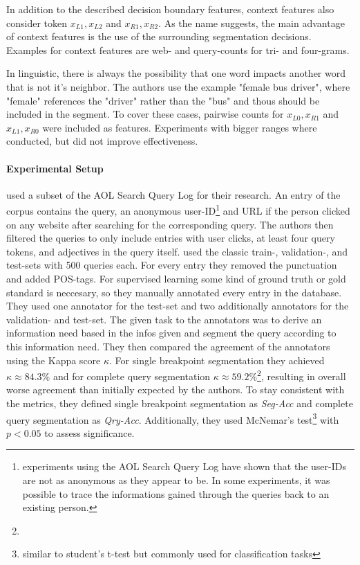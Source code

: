 In addition to the described decision boundary features, context features also consider token $x_{L1}, x_{L2}$ and $x_{R1}, x_{R2}$. As the name suggests, the main advantage of context features is the use of the surrounding segmentation decisions. Examples for context features are web- and query-counts for tri- and four-grams.

In linguistic, there is always the possibility that one word impacts another word that is not it's neighbor. The authors use the example "female bus driver", where "female" references the "driver" rather than the "bus" and thous should be included in the segment. To cover these cases, pairwise counts for $x_{L0},x_{R1}$ and $x_{L1},x_{R0}$ were included as features. Experiments with bigger ranges where conducted, but did not improve effectiveness.

\paragraph*{Experimental Setup}
\citeauthor{Bergsma:2007} used a subset of the AOL Search Query Log \cite{Pass:2006} for their research. An entry of the corpus contains the query, an anonymous user-ID\footnote{experiments using the AOL Search Query Log have shown that the user-IDs are not as anonymous as they appear to be. In some experiments, it was possible to trace the informations gained through the queries back to an existing person.} and URL if the person clicked on any website after searching for the corresponding query.
The authors then filtered the queries to only include entries with user clicks, at least four query tokens, and adjectives in the query itself.
\citeauthor{Bergsma:2007} used the classic train-, validation-, and test-sets with 500 queries each. For every entry they removed the punctuation and added POS-tags. For supervised learning some kind of ground truth or gold standard is neccesary, so they manually annotated every entry in the database. They used one annotator for the test-set and two additionally annotators for the validation- and test-set. The given task to the annotators was to derive an information need based in the infos given and segment the query according to this information need. They then compared the agreement of the annotators using the Kappa score $\kappa$. For single breakpoint segmentation they achieved $\kappa \approx 84.3\%$ and for complete query segmentation $\kappa \approx 59.2\%$\footnote{}, resulting in overall worse agreement than initially expected by the authors.
To stay consistent with the metrics, they defined single breakpoint segmentation as \textit{Seg-Acc} and complete query segmentation as \textit{Qry-Acc}. Additionally, they used McNemar's test\footnote{similar to student's t-test but commonly used for classification tasks} with $p<0.05$ to assess significance.

